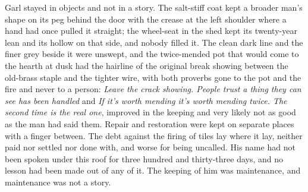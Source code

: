 Garl stayed in objects and not in a story. The salt-stiff coat kept a broader man's shape on its peg behind the door with the crease at the left shoulder where a hand had once pulled it straight; the wheel-seat in the shed kept its twenty-year lean and its hollow on that side, and nobody filled it. The clean dark line and the finer grey beside it were unswept, and the twice-mended pot that would come to the hearth at dusk had the hairline of the original break showing between the old-brass staple and the tighter wire, with both proverbs gone to the pot and the fire and never to a person: \emph{Leave the crack showing. People trust a thing they can see has been handled} and \emph{If it's worth mending it's worth mending twice. The second time is the real one}, improved in the keeping and very likely not as good as the man had said them. Repair and restoration were kept on separate places with a finger between. The debt against the firing of tiles lay where it lay, neither paid nor settled nor done with, and worse for being uncalled. His name had not been spoken under this roof for three hundred and thirty-three days, and no lesson had been made out of any of it. The keeping of him was maintenance, and maintenance was not a story.

